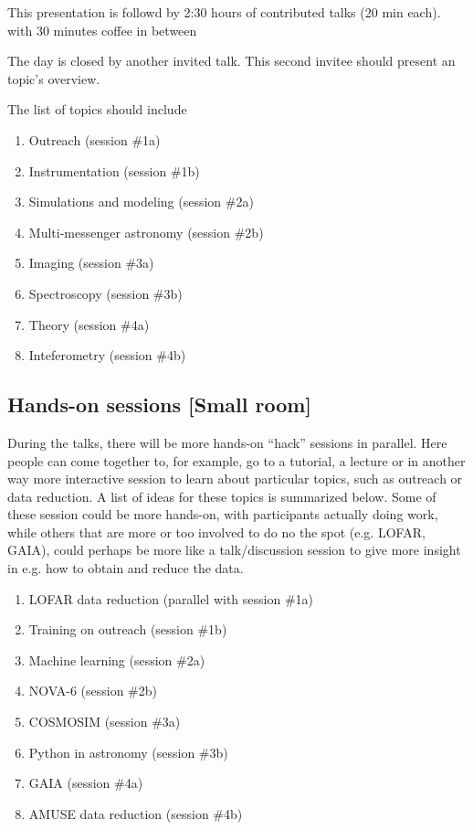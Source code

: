 \documentclass{article}
\begin{document}
This presentation is followd by 2:30 hours of contributed talks (20 min each).
with 30 minutes coffee in between 

The day is closed by another invited talk. This second invitee should present an topic's overview.

The list of topics should include
\begin{multicols}{2}
    \begin{enumerate}
        \item Outreach (session \#1a)
        \item Instrumentation (session \#1b)
        \item Simulations and modeling (session \#2a)
        \item Multi-messenger astronomy (session \#2b)
        \item Imaging (session \#3a)
        \item Spectroscopy (session \#3b)
        \item Theory (session \#4a)
        \item Inteferometry (session \#4b)
    \end{enumerate}
\end{multicols}

\subsection{Hands-on sessions [Small room]}

During the talks, there will be more hands-on ``hack'' sessions in
parallel. Here people can come together to, for example, go to a
tutorial, a lecture or in another way more interactive session to
learn about particular topics, such as outreach or data reduction. A
list of ideas for these topics is summarized below. Some of these
session could be more hands-on, with participants actually doing work,
while others that are more or too involved to do no the spot
(e.g. LOFAR, GAIA), could perhaps be more like a talk/discussion
session to give more insight in e.g. how to obtain and reduce the
data.

\begin{multicols}{2}
    \begin{enumerate}
        \item LOFAR data reduction  (parallel with session \#1a)
        \item Training on outreach  (session \#1b)
        \item Machine learning  (session \#2a)
        \item NOVA-6  (session \#2b)
        \item COSMOSIM  (session \#3a)
        \item Python in astronomy  (session \#3b)
        \item GAIA  (session \#4a)
        \item AMUSE data reduction  (session \#4b)
    \end{enumerate}
\end{multicols}
\end{document}
